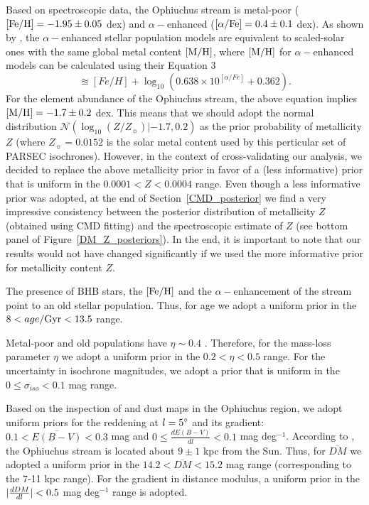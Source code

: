 \documentclass[iop]{emulateapj}
\begin{document}
Based on spectroscopic data, the Ophiuchus stream is metal-poor
(${\rm [Fe/H]=-1.95\pm0.05}$ dex) and $\alpha-$enhanced
(${\rm [\alpha/Fe]=0.4\pm0.1}$ dex). As shown by \citet{scs93}, the
$\alpha-$enhanced stellar population models are equivalent to scaled-solar ones 
with the same global metal content ${\rm [M/H]}$, where ${\rm [M/H]}$ for
$\alpha-$enhanced models can be calculated using their Equation 3
\begin{equation}
    [M/H]\approxeq [Fe/H] + \log_{10}(0.638\times10^{[\alpha/Fe]} + 0.362).
\end{equation}
For the element abundance of the Ophiuchus stream, the above equation implies
${\rm [M/H]}=-1.7\pm0.2$ dex. This means that we should adopt the normal
distribution $\mathcal{N}(\log_{10}(Z/Z_\sun)| -1.7, 0.2)$ as the prior
probability of metallicity $Z$ (where $Z_\sun=0.0152$ is the solar metal content
used by this perticular set of PARSEC isochrones). However, in the context of
cross-validating our analysis, we decided to replace the above metallicity prior
in favor of a (less informative) prior that is uniform in the
$0.0001 < Z < 0.0004$ range. Even though a less informative prior was adopted,
at the end of Section~\ref{CMD_posterior} we find a very impressive consistency
between the posterior distribution of metallicity $Z$ (obtained using CMD
fitting) and the spectroscopic estimate of $Z$ (see bottom panel of
Figure~\ref{DM_Z_posteriors}). In the end, it is important to note that our
results would not have changed significantly if we used the more informative
prior for metallicity content $Z$.

The presence of BHB stars, the ${\rm [Fe/H]}$ and the $\alpha-$enhancement of
the stream point to an old stellar population. Thus, for age we adopt a uniform
prior in the $8 < age/{\rm Gyr} < 13.5$ range.

Metal-poor and old populations have $\eta\sim0.4$ \citep{rpf88}. Therefore, for
the mass-loss parameter $\eta$ we adopt a uniform prior in the $0.2<\eta<0.5$
range. For the uncertainty in isochrone magnitudes, we adopt a prior that is
uniform in the $0 \leq \sigma_{iso} < 0.1$ mag range.

Based on the inspection of \citet{SFD98} and \citet{sch14} dust maps in the
Ophiuchus region, we adopt uniform priors for the reddening at $l=5\mbox{$^\circ$}$ and 
its gradient: $0.1 < \overline{E(B-V)} < 0.3$ mag and
$0 \leq \frac{dE(B-V)}{dl} < 0.1$ mag deg$^{-1}$. According to \citet{ber14b},
the Ophiuchus stream is located about $9\pm1$ kpc from the Sun. Thus, for
$\overline{DM}$ we adopted a uniform prior in the $14.2 < \overline{DM} < 15.2$ 
mag range (corresponding to the 7-11 kpc range). For the gradient in distance
modulus, a uniform prior in the
$\arrowvert\frac{dDM}{dl}\arrowvert < 0.5$ mag deg$^{-1}$ range is adopted.
\end{document}
